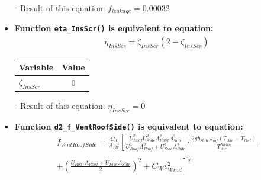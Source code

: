 \documentclass[a4paper]{article}
\numberwithin{equation}{section}
\begin{document}
\begin{itemize}
  \item[-] Result of this equation: \( f_{leakage} = 0.00032 \)

  \item \textbf{Function \texttt{eta\_InsScr()} is equivalent to equation:}
        \begin{align*}
          \eta_{InsScr} = \zeta_{InsScr} (2 -  \zeta_{InsScr})
        \end{align*}

        \begin{table}[H]
          \centering
          \begin{tabular}{@{}lS@{}}
            \toprule
            \textbf{Variable}  & \textbf{Value} \\
            \midrule
            \( \zeta_{InsScr} \) & 0              \\
            \bottomrule
          \end{tabular}
        \end{table}

  \item[-] Result of this equation: \( \eta_{InsScr} = 0 \)

  \item \textbf{Function \texttt{d2\_f\_VentRoofSide()} is equivalent to equation:}
        \begin{align*}
          f_{VentRoofSide} = \frac{C_d}{A_{Flr}} \left[\frac{U_{Roof}^2 U_{Side}^2 A_{Roof}^2 A_{Side}^2}{U_{Roof}^2 A_{Roof}^2 + U_{Side}^2 A_{Side}^2} \cdot \frac{2gh_{SideRoof} (T_{Air} - T_{Out})}{T_{Air}^{Mean}}\right. \\
          + \left.{ \left(\frac{U_{Roof} A_{Roof} + U_{Side} A_{Side}}{2}\right)}^2 + C_W v_{Wind}^2\right]^{\frac{1}{2}}
        \end{align*}


\end{itemize}
\end{document}
